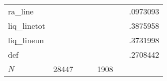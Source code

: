 \begin{table}[htbp]
\begin{tabular}{l*{2}{ccc}}
ra\_line     &            &            &            &            &            &    .0973093\\
liq\_linetot &            &            &            &            &            &    .3875958\\
liq\_lineun  &            &            &            &            &            &    .3731998\\
def         &            &            &            &            &            &    .2708442\\
\hline
\(N\)       &       28447&            &            &        1908&            &            \\
\hline\hline
\end{tabular}
\end{table}
